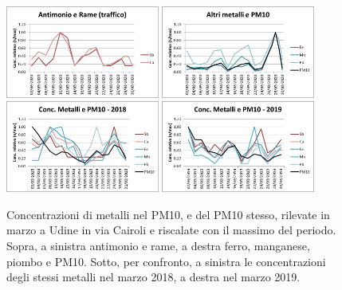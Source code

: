 \begin{figure}
    \centering
    \includegraphics[width=0.45\textwidth]{figs/Sb-Cu-2020.png}
    \includegraphics[width=0.45\textwidth]{figs/metalli-2020.png}\\
    \includegraphics[width=0.45\textwidth]{figs/metalli-2018.png}
    \includegraphics[width=0.45\textwidth]{figs/metalli-2019.png}
    \caption[Metalli nel PM10 a Udine]{Concentrazioni di metalli nel PM10, e del PM10 stesso, rilevate in marzo a Udine in via Cairoli e riscalate con il massimo del periodo. Sopra, a sinistra antimonio e rame, a destra ferro, manganese, piombo e PM10. Sotto, per confronto, a sinistra le concentrazioni degli stessi metalli nel marzo 2018, a destra nel marzo 2019.}
    \label{fig:metalli1}
\end{figure}


